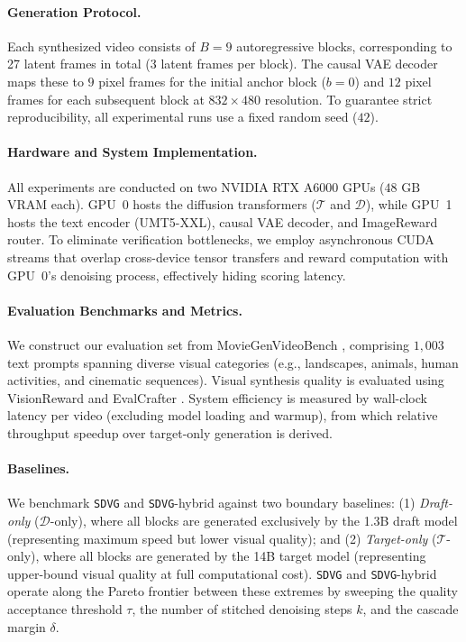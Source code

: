 \documentclass{article} %
\newcommand{\threshold}{\tau}
\begin{document}
\paragraph{Generation Protocol.}
Each synthesized video consists of $B=9$ autoregressive blocks, corresponding to 27 latent frames in total (3 latent frames per block). The causal VAE decoder maps these to $9$ pixel frames for the initial anchor block ($b=0$) and $12$ pixel frames for each subsequent block at $832 \times 480$ resolution. To guarantee strict reproducibility, all experimental runs use a fixed random seed ($42$).

\paragraph{Hardware and System Implementation.}
All experiments are conducted on two NVIDIA RTX A6000 GPUs ($48\text{~GB}$ VRAM each). GPU~0 hosts the diffusion transformers ($\mathcal{T}$ and $\mathcal{D}$), while GPU~1 hosts the text encoder (UMT5-XXL), causal VAE decoder, and ImageReward router. To eliminate verification bottlenecks, we employ asynchronous CUDA streams that overlap cross-device tensor transfers and reward computation with GPU~0's denoising process, effectively hiding scoring latency.

\paragraph{Evaluation Benchmarks and Metrics.}
We construct our evaluation set from MovieGenVideoBench \citep{polyak2024movie}, comprising $1{,}003$ text prompts spanning diverse visual categories (e.g., landscapes, animals, human activities, and cinematic sequences). Visual synthesis quality is evaluated using VisionReward \citep{xu2026visionrewardfinegrainedmultidimensionalhuman} and EvalCrafter \citep{liu2024evalcrafterbenchmarkingevaluatinglarge}. System efficiency is measured by wall-clock latency per video (excluding model loading and warmup), from which relative throughput speedup over target-only generation is derived.

\paragraph{Baselines.}
We benchmark \texttt{SDVG} and \texttt{SDVG}-hybrid against two boundary baselines:
(1) \emph{Draft-only} ($\mathcal{D}$-only), where all blocks are generated exclusively by the 1.3B draft model (representing maximum speed but lower visual quality); and
(2) \emph{Target-only} ($\mathcal{T}$-only), where all blocks are generated by the 14B target model (representing upper-bound visual quality at full computational cost).
\texttt{SDVG} and \texttt{SDVG}-hybrid operate along the Pareto frontier between these extremes by sweeping the quality acceptance threshold $\threshold$, the number of stitched denoising steps $k$, and the cascade margin $\delta$.
\end{document}
